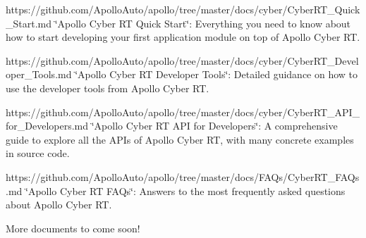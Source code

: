 \begin{DoxyItemize}
\item https\-://github.com/\-Apollo\-Auto/apollo/tree/master/docs/cyber/\-Cyber\-R\-T\-\_\-\-Quick\-\_\-\-Start.\-md \char`\"{}\-Apollo Cyber R\-T Quick Start\char`\"{}\-: Everything you need to know about how to start developing your first application module on top of Apollo Cyber R\-T.
\item https\-://github.com/\-Apollo\-Auto/apollo/tree/master/docs/cyber/\-Cyber\-R\-T\-\_\-\-Developer\-\_\-\-Tools.\-md \char`\"{}\-Apollo Cyber R\-T Developer Tools\char`\"{}\-: Detailed guidance on how to use the developer tools from Apollo Cyber R\-T.
\item https\-://github.com/\-Apollo\-Auto/apollo/tree/master/docs/cyber/\-Cyber\-R\-T\-\_\-\-A\-P\-I\-\_\-for\-\_\-\-Developers.\-md \char`\"{}\-Apollo Cyber R\-T A\-P\-I for Developers\char`\"{}\-: A comprehensive guide to explore all the A\-P\-Is of Apollo Cyber R\-T, with many concrete examples in source code.
\item https\-://github.com/\-Apollo\-Auto/apollo/tree/master/docs/\-F\-A\-Qs/\-Cyber\-R\-T\-\_\-\-F\-A\-Qs.\-md \char`\"{}\-Apollo Cyber R\-T F\-A\-Qs\char`\"{}\-: Answers to the most frequently asked questions about Apollo Cyber R\-T.
\end{DoxyItemize}

More documents to come soon! 